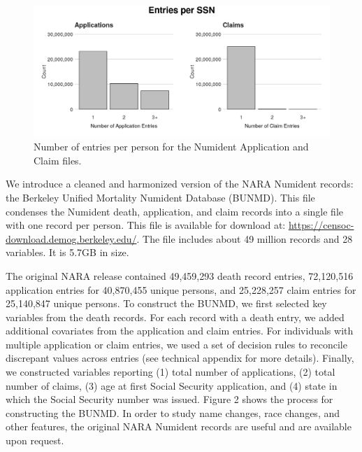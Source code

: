 \documentclass[
  11pt,
]{article}
\begin{document}
\begin{figure}[H]
  \centering
  \includegraphics[width=7in]{../illustrations/entries_per_ssn.png}
  \caption{Number of entries per person for the Numident Application and Claim files.}
  \label{fig:number_entries}
\end{figure}

We introduce a cleaned and harmonized version of the NARA Numident
records: the Berkeley Unified Mortality Numident Database (BUNMD). This
file condenses the Numident death, application, and claim records into a
single file with one record per person. This file is available for
download at: \url{https://censoc-download.demog.berkeley.edu/}. The file
includes about 49 million records and 28 variables. It is 5.7GB in size.

The original NARA release contained 49,459,293 death record entries,
72,120,516 application entries for 40,870,455 unique persons, and
25,228,257 claim entries for 25,140,847 unique persons. To construct the
BUNMD, we first selected key variables from the death records. For each
record with a death entry, we added additional covariates from the
application and claim entries. For individuals with multiple application
or claim entries, we used a set of decision rules to reconcile
discrepant values across entries (see technical appendix for more
details). Finally, we constructed variables reporting (1) total number
of applications, (2) total number of claims, (3) age at first Social
Security application, and (4) state in which the Social Security number
was issued. Figure 2 shows the process for constructing the BUNMD. In
order to study name changes, race changes, and other features, the
original NARA Numident records are useful and are available upon
request.
\end{document}
